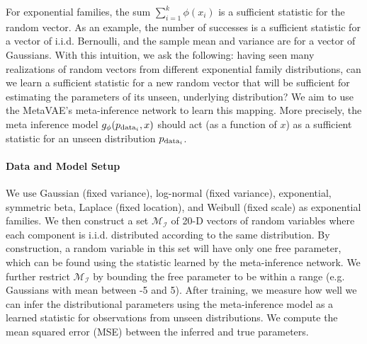 For exponential families, the sum $\sum_{i=1}^k \phi(x_i)$
is a sufficient statistic for the random vector. 
As an example, the number of successes is a sufficient statistic for a vector of i.i.d. Bernoulli, and the sample mean and variance are for a vector of Gaussians. 
With this intuition, we ask the following: having seen many realizations of random vectors from different exponential family distributions, can we learn a sufficient statistic for %
a new random vector that will be sufficient for estimating the parameters of its unseen, underlying distribution?
We aim to use the MetaVAE's meta-inference network to learn this mapping.
More precisely, the meta inference model $g_\phi(p_{\textup{data}_i},x)$ should act (as a function of $x$) as a sufficient statistic for an unseen distribution $p_{\textup{data}_i}$. 

\paragraph{Data and Model Setup}
We use 
Gaussian (fixed variance), log-normal (fixed variance), exponential, symmetric beta, Laplace (fixed location), and Weibull (fixed scale) 
as exponential families. We then construct a set $\mathcal{M}_{\mathcal{I}}$ of 20-D 
vectors of random variables where each component is  i.i.d. distributed according to the same distribution. 
By construction, a random variable in this set will have only one free parameter, which can be found using the statistic learned by the meta-inference network.
We further restrict $\mathcal{M}_{\mathcal{I}}$ by bounding the free parameter to be within a range (e.g. Gaussians with mean between -5 and 5). 
After training, we measure how well we can infer the distributional parameters using the meta-inference model as a learned statistic for observations from unseen distributions. We compute the mean squared error (MSE) between the inferred and true parameters. 

